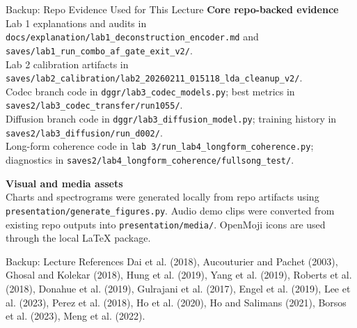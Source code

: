 \documentclass[9pt,aspectratio=169]{beamer}
\begin{document}
\begin{frame}[noframenumbering]{Backup: Repo Evidence Used for This Lecture}
\small
\textbf{Core repo-backed evidence}\\
\footnotesize
Lab 1 explanations and audits in \texttt{docs/explanation/lab1\_deconstruction\_encoder.md} and \texttt{saves/lab1\_run\_combo\_af\_gate\_exit\_v2/}.\\
Lab 2 calibration artifacts in \texttt{saves/lab2\_calibration/lab2\_20260211\_015118\_lda\_cleanup\_v2/}.\\
Codec branch code in \texttt{dggr/lab3\_codec\_models.py}; best metrics in \texttt{saves2/lab3\_codec\_transfer/run1055/}.\\
Diffusion branch code in \texttt{dggr/lab3\_diffusion\_model.py}; training history in \texttt{saves2/lab3\_diffusion/run\_d002/}.\\
Long-form coherence code in \texttt{lab 3/run\_lab4\_longform\_coherence.py}; diagnostics in \texttt{saves2/lab4\_longform\_coherence/fullsong\_test/}.

\vspace{0.35cm}
\textbf{Visual and media assets}\\
\footnotesize
Charts and spectrograms were generated locally from repo artifacts using \texttt{presentation/generate\_figures.py}. Audio demo clips were converted from existing repo outputs into \texttt{presentation/media/}. OpenMoji icons are used through the local LaTeX package.
\end{frame}

\begin{frame}[noframenumbering]{Backup: Lecture References}
\footnotesize
Dai et al. (2018), Aucouturier and Pachet (2003), Ghosal and Kolekar (2018), Hung et al. (2019), Yang et al. (2019), Roberts et al. (2018), Donahue et al. (2019), Gulrajani et al. (2017), Engel et al. (2019), Lee et al. (2023), Perez et al. (2018), Ho et al. (2020), Ho and Salimans (2021), Borsos et al. (2023), Meng et al. (2022).
\end{frame}
\end{document}
